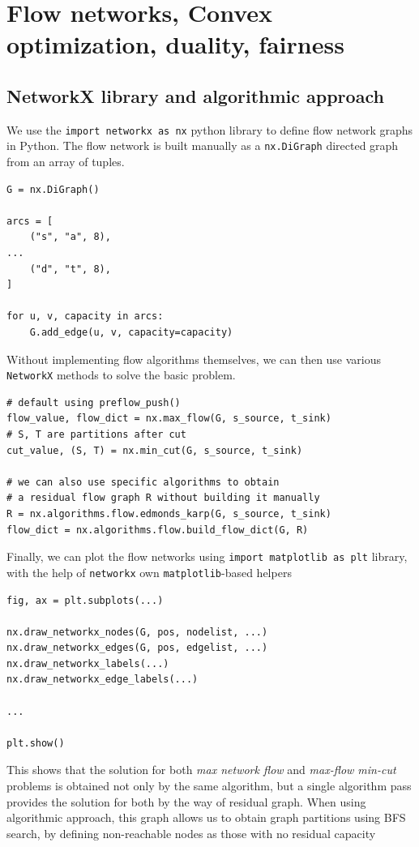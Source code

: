 \documentclass[12pt, openany]{article}
\begin{document}
\newpage
\section{Flow networks, Convex optimization, duality, fairness}
\subsection{NetworkX library and algorithmic approach}

We use the \texttt{import networkx as nx} python library to define flow network graphs in Python. The flow network is built manually as a \texttt{nx.DiGraph} directed graph from an array of tuples.

\begin{verbatim}
G = nx.DiGraph()

arcs = [
    ("s", "a", 8),
...
    ("d", "t", 8),
]

for u, v, capacity in arcs:
    G.add_edge(u, v, capacity=capacity)
\end{verbatim}

Without implementing flow algorithms themselves, we can then use various \texttt{NetworkX} methods to solve the basic problem.
\begin{verbatim}
# default using preflow_push()
flow_value, flow_dict = nx.max_flow(G, s_source, t_sink)
# S, T are partitions after cut
cut_value, (S, T) = nx.min_cut(G, s_source, t_sink)

# we can also use specific algorithms to obtain
# a residual flow graph R without building it manually
R = nx.algorithms.flow.edmonds_karp(G, s_source, t_sink)
flow_dict = nx.algorithms.flow.build_flow_dict(G, R)
\end{verbatim}

Finally, we can plot the flow networks using \texttt{import matplotlib as plt} library, with the help of \texttt{networkx} own \texttt{matplotlib}-based helpers

\begin{verbatim}
fig, ax = plt.subplots(...)

nx.draw_networkx_nodes(G, pos, nodelist, ...)
nx.draw_networkx_edges(G, pos, edgelist, ...)
nx.draw_networkx_labels(...)
nx.draw_networkx_edge_labels(...)

...

plt.show()
\end{verbatim}

This shows that the solution for both \textit{max network flow} and \textit{max-flow min-cut} problems is obtained not only by the same algorithm, but a single algorithm pass provides the solution for both by the way of residual graph. When using algorithmic approach, this graph allows us to obtain graph partitions using BFS search, by defining non-reachable nodes as those with no residual capacity
\end{document}
